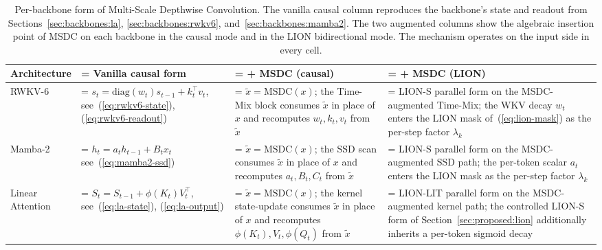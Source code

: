 \begin{table}[t]
\centering
\small
\caption[Per-backbone form of Multi-Scale Depthwise
Convolution]{Per-backbone form of Multi-Scale Depthwise
Convolution. The vanilla causal column reproduces the backbone's
state and readout from Sections~\ref{sec:backbones:la},
\ref{sec:backbones:rwkv6}, and~\ref{sec:backbones:mamba2}. The two
augmented columns show the algebraic insertion point of MSDC on each
backbone in the causal mode and in the LION bidirectional mode. The
mechanism operates on the input side in every cell.}
\label{tab:msdc-deployment}
\setlength{\tabcolsep}{4pt}
\renewcommand{\arraystretch}{1.25}
\begin{tabularx}{\linewidth}{@{}p{2.1cm} >{\hsize=1.15\hsize\linewidth=\hsize}X >{\hsize=0.95\hsize\linewidth=\hsize}X >{\hsize=0.90\hsize\linewidth=\hsize}X@{}}
\toprule
\textbf{Architecture} & \textbf{Vanilla causal form} & \textbf{+ MSDC (causal)} & \textbf{+ MSDC (LION)} \\
\midrule
RWKV-6 &
$s_{t} = \mathrm{diag}(w_{t}) s_{t-1} + k_{t}^{\top} v_{t}$, see~(\ref{eq:rwkv6-state}), (\ref{eq:rwkv6-readout}) &
$\tilde{x} = \mathrm{MSDC}(x)$; the Time-Mix block consumes $\tilde{x}$ in place of $x$ and recomputes $w_{t}, k_{t}, v_{t}$ from $\tilde{x}$ &
LION-S parallel form on the MSDC-augmented Time-Mix; the WKV decay $w_{t}$ enters the LION mask of~(\ref{eq:lion-mask}) as the per-step factor $\lambda_{k}$ \\
\addlinespace
Mamba-2 &
\shortstack[l]{$h_{t} = a_{t} h_{t-1} + B_{t} x_{t}$\\see~(\ref{eq:mamba2-ssd})} &
$\tilde{x} = \mathrm{MSDC}(x)$; the SSD scan consumes $\tilde{x}$ in place of $x$ and recomputes $a_{t}, B_{t}, C_{t}$ from $\tilde{x}$ &
LION-S parallel form on the MSDC-augmented SSD path; the per-token scalar $a_{t}$ enters the LION mask as the per-step factor $\lambda_{k}$ \\
\addlinespace
\shortstack[l]{Linear\\Attention} &
$S_{t} = S_{t-1} + \phi(K_{t}) V_{t}^{\top}$, see~(\ref{eq:la-state}), (\ref{eq:la-output}) &
$\tilde{x} = \mathrm{MSDC}(x)$; the kernel state-update consumes $\tilde{x}$ in place of $x$ and recomputes $\phi(K_{t}), V_{t}, \phi(Q_{t})$ from $\tilde{x}$ &
LION-LIT parallel form on the MSDC-augmented kernel path; the controlled LION-S form of Section~\ref{sec:proposed:lion} additionally inherits a per-token sigmoid decay \\
\bottomrule
\end{tabularx}
\end{table}

